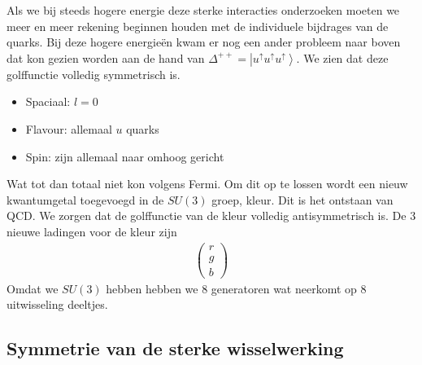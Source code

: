 \documentclass[../main.tex]{subfiles}
\begin{document}
Als we bij steeds hogere energie deze sterke interacties onderzoeken moeten we meer en meer rekening beginnen houden met de individuele bijdrages van de quarks. Bij deze hogere energieën kwam er nog een ander probleem naar boven dat kon gezien worden aan de hand van $\Delta^{++}=\left|u^\uparrow u^\uparrow u^\uparrow\right>$. We zien dat deze golffunctie volledig symmetrisch is.
\begin{itemize}
    \item Spaciaal: $l=0$
    \item Flavour: allemaal $u$ quarks
    \item Spin: zijn allemaal naar omhoog gericht
\end{itemize}
Wat tot dan totaal niet kon volgens Fermi. Om dit op te lossen wordt een nieuw kwantumgetal toegevoegd in de $SU(3)$ groep, kleur. Dit is het ontstaan van QCD. We zorgen dat de golffunctie van de kleur volledig antisymmetrisch is. De 3 nieuwe ladingen voor de kleur zijn
\begin{equation}
    \begin{aligned}
        \label{eq:kleur_lading}
        \begin{pmatrix}
            r\\
            g\\
            b
        \end{pmatrix}
    \end{aligned}
\end{equation}
Omdat we $SU(3)$ hebben  hebben we 8 generatoren wat neerkomt op 8 uitwisseling deeltjes.

\subsection{Symmetrie van de sterke wisselwerking}%
\label{sub:symmetrie_van_de_sterke_wisselwerking}
\end{document}
